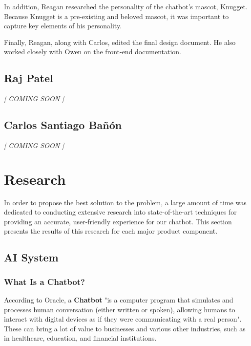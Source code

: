\documentclass[titlepage, 12pt]{article}
\begin{document}
In addition, Reagan researched the personality of the chatbot’s mascot, Knugget. Because Knugget is a pre-existing and beloved mascot, it was important to capture key elements of his personality.

Finally, Reagan, along with Carlos, edited the final design document. He also worked closely with Owen on the front-end documentation.

\subsection{Raj Patel}
\begin{center}\emph{[ COMING SOON ]}\end{center}

\subsection{Carlos Santiago Bañón}
\begin{center}\emph{[ COMING SOON ]}\end{center}

\pagebreak



\section{Research}

In order to propose the best solution to the problem, a large amount of time was dedicated to conducting extensive research into state-of-the-art techniques for providing an accurate, user-friendly experience for our chatbot. This section presents the results of this research for each major product component.

\subsection{AI System}

\subsubsection{What Is a Chatbot?}

According to Oracle, a \textbf{Chatbot} "is a computer program that simulates and processes human conversation (either written or spoken), allowing humans to interact with digital devices as if they were communicating with a real person". These can bring a lot of value to businesses and various other industries, such as in healthcare, education, and financial institutions.
\end{document}
